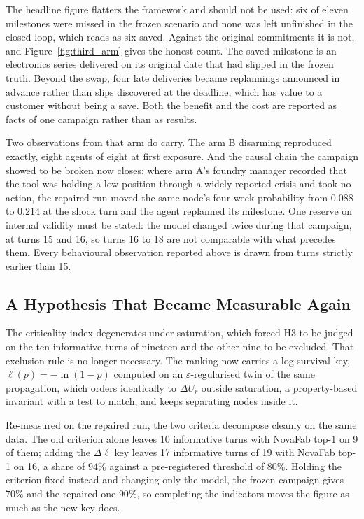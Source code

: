 The headline figure flatters the framework and should not be used: six of eleven milestones
were missed in the frozen scenario and none was left unfinished in the closed loop, which reads
as six saved. Against the original commitments it is not, and Figure~\ref{fig:third_arm} gives
the honest count. The saved milestone is an electronics series delivered on its original date
that had slipped in the frozen truth. Beyond the swap, four late deliveries became replannings
announced in advance rather than slips discovered at the deadline, which has value to a customer
without being a save. Both the benefit and the cost are reported as facts of one campaign rather
than as results.

Two observations from that arm do carry. The arm B disarming reproduced exactly, eight
agents of eight at first exposure. And the causal chain the campaign showed to be broken now
closes: where arm A's foundry manager recorded that the tool was holding a low position
through a widely reported crisis and took no action, the repaired run moved the same node's
four-week probability from $0.088$ to $0.214$ at the shock turn and the agent replanned its
milestone. One reserve on internal validity must be stated: the model changed twice during
that campaign, at turns 15 and 16, so turns 16 to 18 are not comparable with what precedes
them. Every behavioural observation reported above is drawn from turns strictly earlier than
15.

\subsection{A Hypothesis That Became Measurable Again}

The criticality index degenerates under saturation, which forced H3 to be judged on the ten informative turns of nineteen and the other nine to be excluded. That exclusion rule is no longer necessary. The ranking now carries a log-survival key, $\ell(p) = -\ln(1-p)$ computed on an $\varepsilon$-regularised twin of the same propagation, which orders identically to $\Delta U_r$ outside saturation, a property-based invariant with a test to match, and keeps separating nodes inside it.

Re-measured on the repaired run, the two criteria decompose cleanly on the same data. The old criterion alone leaves 10 informative turns with NovaFab top-1 on 9 of them; adding the $\Delta \ell$ key leaves 17 informative turns of 19 with NovaFab top-1 on 16, a share of $94\%$ against a pre-registered threshold of $80\%$. Holding the criterion fixed instead and changing only the model, the frozen campaign gives $70\%$ and the repaired one $90\%$, so completing the indicators moves the figure as much as the new key does.

